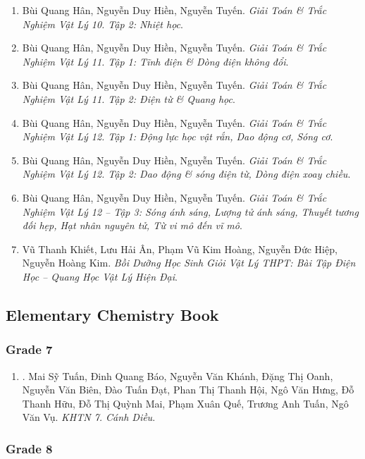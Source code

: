 \documentclass{article}
\begin{document}
\begin{enumerate}
	\item Bùi Quang Hân, Nguyễn Duy Hiền, Nguyễn Tuyến. \textit{Giải Toán \& Trắc Nghiệm Vật Lý 10. Tập 2: Nhiệt học}.
	\item Bùi Quang Hân, Nguyễn Duy Hiền, Nguyễn Tuyến. \textit{Giải Toán \& Trắc Nghiệm Vật Lý 11. Tập 1: Tĩnh điện \& Dòng điện không đổi}.
	\item Bùi Quang Hân, Nguyễn Duy Hiền, Nguyễn Tuyến. \textit{Giải Toán \& Trắc Nghiệm Vật Lý 11. Tập 2: Điện từ \& Quang học}.
	\item Bùi Quang Hân, Nguyễn Duy Hiền, Nguyễn Tuyến. \textit{Giải Toán \& Trắc Nghiệm Vật Lý 12. Tập 1: Động lực học vật rắn, Dao động cơ, Sóng cơ}.
	\item Bùi Quang Hân, Nguyễn Duy Hiền, Nguyễn Tuyến. \textit{Giải Toán \& Trắc Nghiệm Vật Lý 12. Tập 2: Dao động \& sóng điện từ, Dòng điện xoay chiều}.
	\item Bùi Quang Hân, Nguyễn Duy Hiền, Nguyễn Tuyến. \textit{Giải Toán \& Trắc Nghiệm Vật Lý 12 -- Tập 3: Sóng ánh sáng, Lượng tử ánh sáng, Thuyết tương đối hẹp, Hạt nhân nguyên tử, Từ vi mô đến vĩ mô}.
	\item Vũ Thanh Khiết, Lưu Hải Ân, Phạm Vũ Kim Hoàng, Nguyễn Đức Hiệp, Nguyễn Hoàng Kim. \textit{Bồi Dưỡng Học Sinh Giỏi Vật Lý THPT: Bài Tập Điện Học -- Quang Học Vật Lý Hiện Đại}.
\end{enumerate}

\subsection{Elementary Chemistry Book}

\subsubsection{Grade 7}

\begin{enumerate}
	\item \cite{SGK_KHTN_7_Canh_Dieu}. Mai Sỹ Tuấn, Đinh Quang Báo, Nguyễn Văn Khánh, Đặng Thị Oanh, Nguyễn Văn Biên, Đào Tuấn Đạt, Phan Thị Thanh Hội, Ngô Văn Hưng, Đỗ Thanh Hữu, Đỗ Thị Quỳnh Mai, Phạm Xuân Quế, Trương Anh Tuấn, Ngô Văn Vụ. \textit{KHTN 7. Cánh Diều}.\hfill{\sf[reading]}
\end{enumerate}

\subsubsection{Grade 8}
\end{document}
